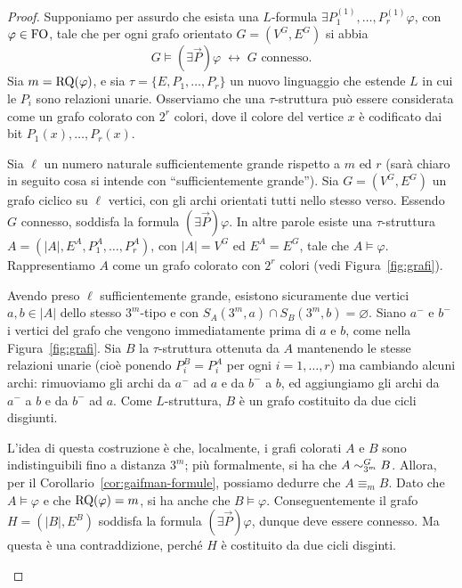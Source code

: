 \begin{proof}
  Supponiamo per assurdo che esista una $L$-formula $\exists P_1^{(1)},\ldots,P_r^{(1)} \varphi$, con $\varphi\in \operatorname{FO}$, tale che per ogni grafo orientato $G=(V^G, E^G)$ si abbia
  \[ G \models (\exists \vec{P}) \varphi \; \longleftrightarrow \; G \text{ connesso}. \]
  Sia $m=\operatorname{RQ}(\varphi)$, e sia $\tau = \{E,P_1,\ldots,P_r\}$ un nuovo linguaggio che estende $L$ in cui le $P_i$ sono relazioni unarie.
  Osserviamo che una $\tau$-struttura può essere considerata come un grafo colorato con $2^r$ colori, dove il colore del vertice $x$ è codificato dai bit $P_1(x),\ldots,P_r(x)$.
  
  Sia $\ell$ un numero naturale sufficientemente grande rispetto a $m$ ed $r$ (sarà chiaro in seguito cosa si intende con ``sufficientemente grande'').
  Sia $G=(V^G, E^G)$ un grafo ciclico su $\ell$ vertici, con gli archi orientati tutti nello stesso verso.
  Essendo $G$ connesso, soddisfa la formula $(\exists\vec{P})\varphi$. In altre parole esiste una $\tau$-struttura $A=(|A|, E^A, P_1^A, \ldots, P_r^A)$, con $|A|=V^G$ ed $E^A = E^G$, tale che $A \models \varphi$.
  Rappresentiamo $A$ come un grafo colorato con $2^r$ colori (vedi Figura~\ref{fig:grafi}).
  
  Avendo preso $\ell$ sufficientemente grande, esistono sicuramente due vertici $a,b\in |A|$ dello stesso $3^m$-tipo e con $S_A(3^m,a) \cap S_B(3^m,b) = \varnothing$.
  Siano $a^-$ e $b^-$ i vertici del grafo che vengono immediatamente prima di $a$ e $b$, come nella Figura~\ref{fig:grafi}.
  Sia $B$ la $\tau$-struttura ottenuta da $A$ mantenendo le stesse relazioni unarie (cioè ponendo $P_i^B = P_i^A$ per ogni $i=1,\dots,r$) ma cambiando alcuni archi: rimuoviamo gli archi da $a^-$ ad $a$ e da $b^-$ a $b$, ed aggiungiamo gli archi da $a^-$ a $b$ e da $b^-$ ad $a$.
  Come $L$-struttura, $B$ è un grafo costituito da due cicli disgiunti.
  
  L'idea di questa costruzione è che, localmente, i grafi colorati $A$ e $B$ sono indistinguibili fino a distanza $3^m$; più formalmente, si ha che $A \sim^{G}_{3^m} B$.
  Allora, per il Corollario~\ref{cor:gaifman-formule}, possiamo dedurre che $A \equiv_m B$.
  Dato che $A\models \varphi$ e che $\operatorname{RQ}(\varphi)=m$, si ha anche che $B\models \varphi$.
  Conseguentemente il grafo $H=(|B|, E^B)$ soddisfa la formula $(\exists \vec{P}) \varphi$, dunque deve essere connesso.
  Ma questa è una contraddizione, perché $H$ è costituito da due cicli disginti.
  
  \begin{figure}[htbp]
    

\end{figure}
\end{proof}
